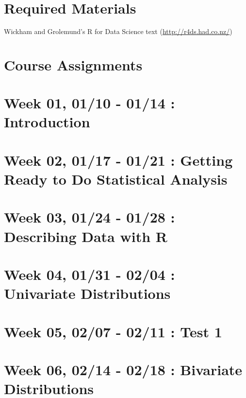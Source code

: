 \hypertarget{required-materials-1}{%
\section{Required Materials}\label{required-materials-1}}

Wickham and Grolemund's R for Data Science text (\url{http://r4ds.had.co.nz/})

\hypertarget{course-assignments-1}{%
\section{Course Assignments}\label{course-assignments-1}}

\hypertarget{week-01-0110---0114-introduction}{%
\section{Week 01, 01/10 - 01/14 : Introduction}\label{week-01-0110---0114-introduction}}

\hypertarget{week-02-0117---0121-getting-ready-to-do-statistical-analysis}{%
\section{Week 02, 01/17 - 01/21 : Getting Ready to Do Statistical Analysis}\label{week-02-0117---0121-getting-ready-to-do-statistical-analysis}}

\hypertarget{week-03-0124---0128-describing-data-with-r}{%
\section{Week 03, 01/24 - 01/28 : Describing Data with R}\label{week-03-0124---0128-describing-data-with-r}}

\hypertarget{week-04-0131---0204-univariate-distributions}{%
\section{Week 04, 01/31 - 02/04 : Univariate Distributions}\label{week-04-0131---0204-univariate-distributions}}

\hypertarget{week-05-0207---0211-test-1}{%
\section{Week 05, 02/07 - 02/11 : Test 1}\label{week-05-0207---0211-test-1}}

\hypertarget{week-06-0214---0218-bivariate-distributions}{%
\section{Week 06, 02/14 - 02/18 : Bivariate Distributions}\label{week-06-0214---0218-bivariate-distributions}}

